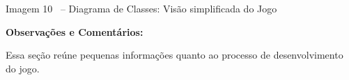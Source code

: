 \documentclass[a4paper]{article}
\begin{document}
\bigskip


\bigskip


\bigskip


\bigskip


\bigskip


\bigskip


\bigskip


\bigskip


\bigskip


\bigskip


\bigskip

{\centering\color{black}
Imagem 10 \ – Diagrama de Classes: Visão simplificada do Jogo
\par}


\bigskip

{\color{black}
\textbf{Observações e Comentários:}}

{\color{black}
Essa seção reúne pequenas informações quanto ao processo de
desenvolvimento do jogo.}
\end{document}
